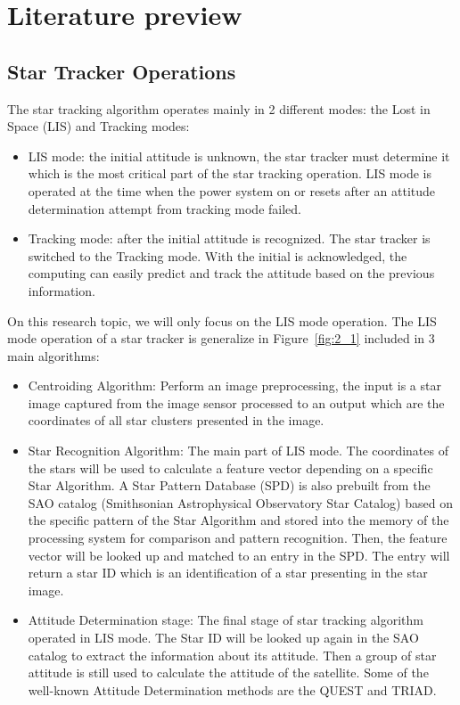 
\chapter{Literature preview}
\label{chap:lit_review}

\section{Star Tracker Operations}

The star tracking algorithm operates mainly in 2 different modes: the Lost in Space (LIS) and Tracking modes:
\begin{itemize}
	\item LIS mode: the initial attitude is unknown, the star tracker must determine it which is the most critical part of the star tracking operation. LIS mode is operated at the time when the power system on or resets after an attitude determination attempt from tracking mode failed\cite{edselc.2-52.0-8487677997120120101}.
	\item Tracking mode: after the initial attitude is recognized. The star tracker is switched to the Tracking mode. With the initial is acknowledged, the computing can easily predict and track the attitude based on the previous information.
\end{itemize}

\noindent On this research topic, we will only focus on the LIS mode operation. The LIS mode operation of a star tracker is generalize in Figure~\ref{fig:2_1} included in 3 main algorithms:
\begin{itemize}
	\item Centroiding Algorithm: Perform an image preprocessing, the input is a star image captured from the image sensor processed to an output which are the coordinates of all star clusters presented in the image.
	\item Star Recognition Algorithm: The main part of LIS mode. The coordinates of the stars will be used to calculate a feature vector depending on a specific Star Algorithm. A Star Pattern Database (SPD) is also prebuilt from the SAO catalog (Smithsonian Astrophysical Observatory Star Catalog) based on the specific pattern of the Star Algorithm and stored into the memory of the processing system for comparison and pattern recognition\cite{edseee.655799920130101}. Then, the feature vector will be looked up and matched to an entry in the SPD. The entry will return a star ID which is an identification of a star presenting in the star image.
	\item Attitude Determination stage: The final stage of star tracking algorithm operated in LIS mode. The Star ID will be looked up again in the SAO catalog to extract the information about its attitude. Then a group of star attitude is still used to calculate the attitude of the satellite. Some of the well-known Attitude Determination methods are the QUEST and TRIAD.
\end{itemize}

